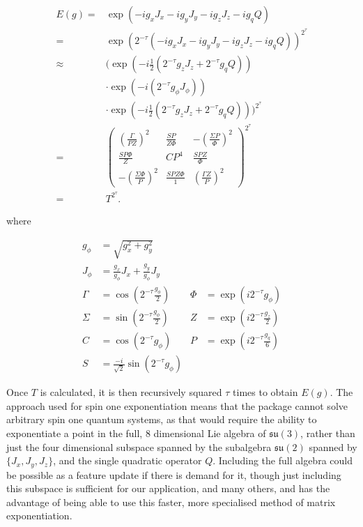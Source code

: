 \documentclass{jors}
\begin{document}
			\begin{align}
                E(g) =& \exp\left(-ig_x J_x - ig_y J_y - ig_z J_z - ig_q Q\right)\\
                =& \exp\left(2^{-\tau}\left(-ig_x J_x - ig_y J_y - ig_z J_z - ig_q Q\right)\right)^{2^\tau}\\
                \approx& \biggl(\exp\left(-i\frac12\left(2^{-\tau} g_z J_z + 2^{-\tau}g_q Q\right)\right)\nonumber\\
				&\cdot\exp\left(-i\left(2^{-\tau} g_\phi J_\phi\right)\right)\nonumber\\
				&\cdot\exp\left(-i\frac12\left(2^{-\tau} g_z J_z + 2^{-\tau} g_q Q\right)\right)\biggr)^{2^\tau}\\
                =& \begin{pmatrix}
                    \left(\frac{\Gamma}{PZ}\right)^2 & \frac{SP}{Z\Phi} & -\left(\frac{\Sigma P}{\Phi}\right)^2 \\
					\frac{SP\Phi}{Z} & CP^4 & \frac{SPZ}{\Phi} \\
					-\left(\frac{\Sigma \Phi}{P}\right)^2 & \frac{SPZ\Phi}{1} & \left(\frac{\Gamma Z}{P}\right)^2
                \end{pmatrix}^{2^\tau}\\
				=& T^{2^\tau}.
            \end{align}

			where

            \begin{align}
				g_\phi &= \sqrt{g_x^2 + g_y^2}&&\nonumber\\
				J_\phi &= \frac{g_x}{g_\phi}J_x + \frac{g_y}{g_\phi}J_y&&\nonumber\\
				\Gamma &= \cos\left(2^{-\tau} \frac{g_\phi}{2}\right) & \Phi &= \exp\left(i2^{-\tau}g_\phi\right)\nonumber\\
				\Sigma &= \sin\left(2^{-\tau} \frac{g_\phi}{2}\right) & Z &= \exp\left(i2^{-\tau}\frac{g_z}{2}\right)\nonumber\\
				C &= \cos\left(2^{-\tau} g_\phi\right) & P &= \exp\left(i2^{-\tau}\frac{g_q}{6}\right)\nonumber\\
				S &= \frac{-i}{\sqrt2}\sin\left(2^{-\tau} g_\phi\right)&&
            \end{align}
        
			Once \(T\) is calculated, it is then recursively squared \(\tau\) times to obtain \(E(g)\). The approach used for spin one exponentiation means that the package cannot solve arbitrary spin one quantum systems, as that would require the ability to exponentiate a point in the full, 8 dimensional Lie algebra of \(\mathfrak{su}(3)\), rather than just the four dimensional subspace spanned by the subalgebra \(\mathfrak{su}(2)\) spanned by \(\{J_x, J_y, J_z\}\), and the single quadratic operator \(Q\). Including the full algebra could be possible as a feature update if there is demand for it, though just including this subspace is sufficient for our application, and many others, and has the advantage of being able to use this faster, more specialised method of matrix exponentiation.
\end{document}

